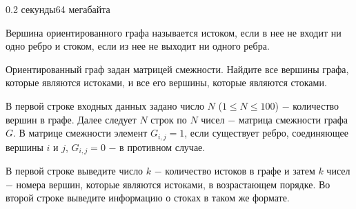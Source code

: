 \begin{problem}{}{}{}{0.2 секунды}{64 мегабайта}

Вершина ориентированного графа называется истоком, если в нее не входит ни одно ребро и стоком, если из нее не 
выходит ни одного ребра. 

Ориентированный граф задан матрицей смежности. Найдите все вершины графа, которые являются истоками, и все его вершины, 
которые являются стоками.

\InputFile
В первой строке входных данных задано число $N$ ($1 \le N \le 100$) $-$ количество вершин в графе.
Далее следует $N$ строк по $N$ чисел $-$ матрица смежности графа $G$. В матрице смежности элемент $G_{i,j}=1$, если
существует ребро, соединяющее вершины $i$ и $j$, $G_{i,j}=0$ $-$ в противном случае.

\OutputFile
В первой строке выведите число $k$ $-$ количество истоков в графе и затем $k$ чисел $-$ номера вершин, 
которые являются истоками, в возрастающем порядке. Во второй строке выведите информацию о стоках в таком же формате.

\Example
\begin{example}
%
\end{example}

\end{problem}

